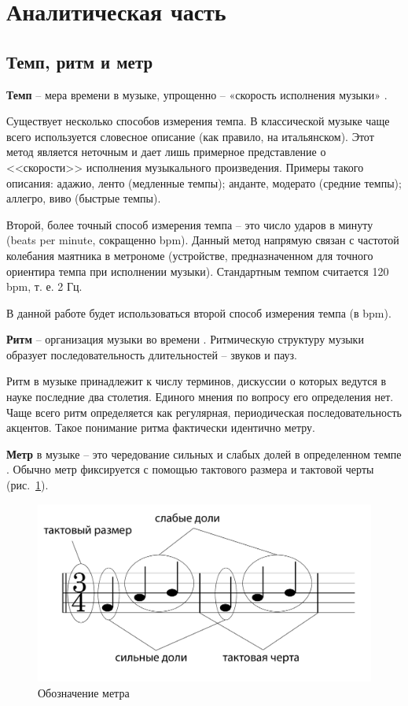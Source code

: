 \section{Аналитическая часть}

\subsection{Темп, ритм и метр}

\textbf{Темп} -- мера времени в музыке, упрощенно -- «скорость исполнения музыки» \cite{grouv}.

Существует несколько способов измерения темпа. В классической музыке чаще всего используется словесное описание (как правило, на итальянском). Этот метод является неточным и дает лишь примерное представление о <<скорости>> исполнения музыкального произведения. Примеры такого описания: адажио, ленто (медленные темпы); анданте, модерато (средние темпы); аллегро, виво (быстрые темпы).

Второй, более точный способ измерения темпа -- это число ударов в минуту (beats per minute, сокращенно bpm). Данный метод напрямую связан с частотой колебания маятника в метрономе (устройстве, предназначенном для точного ориентира темпа при исполнении музыки). Стандартным темпом считается 120 bpm, т. е. 2 Гц.

В данной работе будет использоваться второй способ измерения темпа (в bpm).

\textbf{Ритм} -- организация музыки во времени \cite{chehovich}. Ритмическую структуру музыки образует последовательность длительностей -- звуков и пауз.

Ритм в музыке принадлежит к числу терминов, дискуссии о которых ведутся в науке последние два столетия. Единого мнения по вопросу его определения нет. Чаще всего ритм определяется как регулярная, периодическая последовательность акцентов. Такое понимание ритма фактически идентично метру.

\textbf{Метр} в музыке -- это чередование сильных и слабых долей в определенном темпе \cite{grouv}. Обычно метр фиксируется с помощью тактового размера и тактовой черты (рис.~\ref{img:meter}).

\begin{figure}[h!]
	\begin{center}
		\includegraphics[scale=0.4]{svg/barlines.pdf}
	\end{center}
	\captionsetup{justification=centering}
	\caption{Обозначение метра}
	\label{img:meter}
\end{figure}

